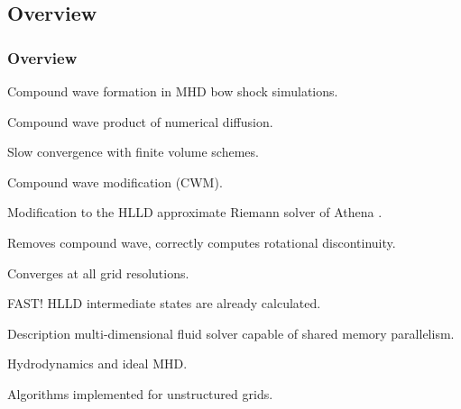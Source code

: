 \documentclass{beamer}
\begin{document}
\subsection{Overview}

\begin{frame}[fragile]
\frametitle{Overview}
\bei
\item Compound wave formation in MHD bow shock simulations.
\pause
\item Compound wave product of numerical diffusion.
\pause
\item Slow convergence with finite volume schemes.
\pause
\item Compound wave modification (CWM). 
\bei
\item Modification to the HLLD approximate Riemann solver of Athena \citep{AthenaSite}.
\item Removes compound wave, correctly computes rotational discontinuity.
\item Converges at all grid resolutions.
\item FAST! HLLD intermediate states are already calculated.
\ebi 
\pause
\item Description multi-dimensional fluid solver capable of shared memory parallelism.
\bei
\item Hydrodynamics and ideal MHD.
\item Algorithms implemented for unstructured grids.
\ebi
\ebi
\end{frame}
\end{document}
